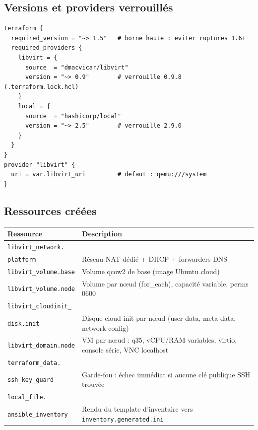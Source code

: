 \documentclass[12pt,a4paper,twoside,openright]{report}
\begin{document}
\subsection{Versions et providers verrouillés}
\begin{lstlisting}[caption={main.tf : épinglage des versions (extrait)}]
terraform {
  required_version = "~> 1.5"   # borne haute : eviter ruptures 1.6+
  required_providers {
    libvirt = {
      source  = "dmacvicar/libvirt"
      version = "~> 0.9"        # verrouille 0.9.8 (.terraform.lock.hcl)
    }
    local = {
      source  = "hashicorp/local"
      version = "~> 2.5"        # verrouille 2.9.0
    }
  }
}
provider "libvirt" {
  uri = var.libvirt_uri         # defaut : qemu:///system
}
\end{lstlisting}

\subsection{Ressources créées}
\begin{center}\label{tab:ch-terraform-ressources-creees}\end{center}
\begin{longtable}{@{}p{4.4cm}p{9.8cm}@{}}
\toprule
\textbf{Ressource} & \textbf{Description} \\
\midrule
\endhead
\texttt{libvirt\_network.}\\ \texttt{platform} & Réseau NAT dédié + DHCP + forwarders DNS \\
\texttt{libvirt\_volume.base} & Volume qcow2 de base (image Ubuntu cloud) \\
\texttt{libvirt\_volume.node} & Volume par nœud (for\_each), capacité variable, perms 0600 \\
\texttt{libvirt\_cloudinit\_}\\ \texttt{disk.init} & Disque cloud-init par nœud (user-data, meta-data, network-config) \\
\texttt{libvirt\_domain.node} & VM par nœud : q35, vCPU/RAM variables, virtio, console série, VNC localhost \\
\texttt{terraform\_data.}\\ \texttt{ssh\_key\_guard} & Garde-fou : échec immédiat si aucune clé publique SSH trouvée \\
\texttt{local\_file.}\\ \texttt{ansible\_inventory} & Rendu du template d'inventaire vers \texttt{inventory.generated.ini} \\
\bottomrule
\end{longtable}
\end{document}
